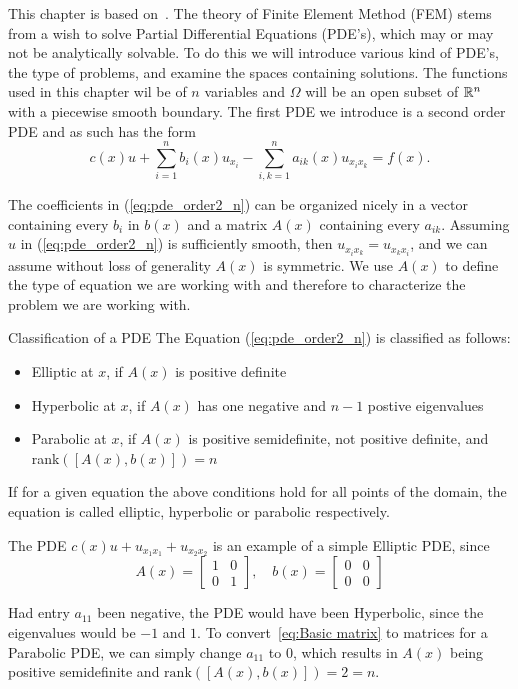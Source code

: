 This chapter is based on~\cite{Braess}.
The theory of Finite Element Method (FEM) stems from a 
wish to solve Partial Differential Equations (PDE's),
which may or may not be analytically solvable. 
To do this we will introduce various kind of PDE's, 
the type of
problems, and examine the spaces containing solutions. 
The functions used in this chapter wil be of $n$ 
variables and $\Omega$ will be 
an open subset of $\mathbb{R}^n$ with a piecewise smooth boundary.
The first PDE we introduce is a second order PDE and as 
such has the form
\begin{equation}
	 c(x) u + \sum_{i=1}^{n}b_i(x)u_{x_{i}}
	- \sum_{i,k=1}^{n}a_{ik}(x)u_{x_i x_k}\label{eq:pde_order2_n}
	= f(x).
\end{equation}

The coefficients in (\ref*{eq:pde_order2_n}) can be 
organized nicely in a vector containing every $b_i$ 
in $b(x)$
and a matrix $A(x)$ containing every $a_{ik}$.
Assuming $u$ in (\ref*{eq:pde_order2_n}) is sufficiently 
smooth, then $u_{x_i x_k} =u_{x_k x_i} $, and we can 
assume without loss of generality $A(x)$ is 
symmetric. %
We use $A(x)$ to define the type of equation we are working 
with and therefore to characterize the problem we are 
working with.
\begin{defn}{Classification of a PDE}
	The Equation (\ref{eq:pde_order2_n}) is classified as follows:
	\begin{itemize}
		\item Elliptic at $x$, if $A(x)$ is positive definite
		\item Hyperbolic at $x$, if $A(x)$ has one negative and $n-1$ postive eigenvalues
		\item Parabolic at $x$, if $A(x)$ is positive semidefinite, not positive definite, and rank$([A(x), b(x)])=n$
	\end{itemize}
	If for a given equation the above conditions hold for all points of the domain, the equation is called elliptic, hyperbolic or parabolic respectively.\label{def:pde_classification}
\end{defn}


\begin{exmp}
The PDE $c(x)u + u_{x_1x_1} + u_{x_2x_2}$ is an example of a simple Elliptic PDE, since
\begin{equation}\label{eq:Basic matrix}
	A(x) = \begin{bmatrix}
		1 & 0\\
		0 & 1
	\end{bmatrix}, \quad
	b(x) = \begin{bmatrix}
		0 & 0\\
		0 & 0
	\end{bmatrix}
\end{equation}

Had entry $a_{11}$ been negative, the PDE would have been Hyperbolic, since the eigenvalues would be $-1$ and $1$. To convert~\eqref{eq:Basic matrix} to matrices for a Parabolic PDE, we can simply change $a_{11}$ to $0$, which results in $A(x)$ being positive semidefinite and $\text{rank}([A(x), b(x)]) = 2 = n$.
\end{exmp}
	

